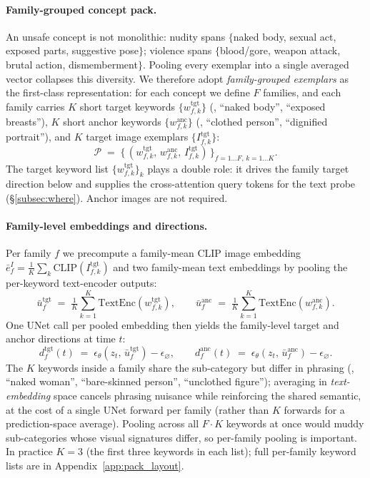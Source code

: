 \paragraph{Family-grouped concept pack.}
An unsafe concept is not monolithic: nudity spans $\{$naked body, sexual act, exposed parts, suggestive pose$\}$; violence spans $\{$blood/gore, weapon attack, brutal action, dismemberment$\}$. Pooling every exemplar into a single averaged vector collapses this diversity. We therefore adopt \emph{family-grouped exemplars} as the first-class representation: for each concept we define $F$ families, and each family carries $K$ short target keywords $\{w^{\text{tgt}}_{f,k}\}$ (\eg, ``naked body'', ``exposed breasts''), $K$ short anchor keywords $\{w^{\text{anc}}_{f,k}\}$ (\eg, ``clothed person'', ``dignified portrait''), and $K$ target image exemplars $\{I^{\text{tgt}}_{f,k}\}$:
\begin{equation}
    \mathcal{P} \;=\; \big\{\,(w^{\text{tgt}}_{f,k},\, w^{\text{anc}}_{f,k},\, I^{\text{tgt}}_{f,k})\,\big\}_{f=1\dots F,\,k=1\dots K}.
    \label{eq:pack}
\end{equation}
The target keyword list $\{w^{\text{tgt}}_{f,k}\}_k$ plays a double role: it drives the family target direction below and supplies the cross-attention query tokens for the text probe (\S\ref{subsec:where}). Anchor images are not required.

\paragraph{Family-level embeddings and directions.}
Per family $f$ we precompute a family-mean CLIP image embedding $\bar{e}^{I}_f = \tfrac{1}{K}\sum_{k}\mathrm{CLIP}(I^{\text{tgt}}_{f,k})$ and two family-mean text embeddings by pooling the per-keyword text-encoder outputs:
\begin{equation}
    \bar{u}^{\text{tgt}}_f \;=\; \tfrac{1}{K}\textstyle\sum_{k=1}^{K} \mathrm{TextEnc}(w^{\text{tgt}}_{f,k}),
    \qquad
    \bar{u}^{\text{anc}}_f \;=\; \tfrac{1}{K}\textstyle\sum_{k=1}^{K} \mathrm{TextEnc}(w^{\text{anc}}_{f,k}).
    \label{eq:fam_embed}
\end{equation}
One UNet call per pooled embedding then yields the family-level target and anchor directions at time $t$:
\begin{equation}
    d^{\text{tgt}}_f(t) \;=\; \epsilon_\theta(z_t,\, \bar{u}^{\text{tgt}}_f) - \epsilon_\varnothing,
    \qquad
    d^{\text{anc}}_f(t) \;=\; \epsilon_\theta(z_t,\, \bar{u}^{\text{anc}}_f) - \epsilon_\varnothing.
    \label{eq:fam_dirs}
\end{equation}
The $K$ keywords inside a family share the sub-category but differ in phrasing (\eg, ``naked woman'', ``bare-skinned person'', ``unclothed figure''); averaging in \emph{text-embedding} space cancels phrasing nuisance while reinforcing the shared semantic, at the cost of a single UNet forward per family (rather than $K$ forwards for a prediction-space average). Pooling across all $F{\cdot}K$ keywords at once would muddy sub-categories whose visual signatures differ, so per-family pooling is important. In practice $K{=}3$ (the first three keywords in each list); full per-family keyword lists are in Appendix~\ref{app:pack_layout}.

